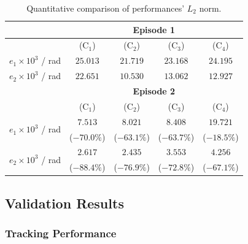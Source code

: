 \documentclass[lettersize,journal]{IEEEtran}
\begin{document}
\begin{table}[!t]
    \renewcommand{\arraystretch}{1.3}
    \caption{Quantitative comparison of performances' $L_2$ norm.}
    \centering
    \begin{tabular}{c c c c c}
    \hline
		& \multicolumn{4}{c}{\textbf{Episode 1}} \\
    \hline
	\hline 
		& (C$_1$) & (C$_2$) & (C$_3$) & (C$_4$) \\
	\hline
		$e_1\times10^{3}$ / rad & $25.013$ & $21.719$ & $23.168$ & $24.195$ \\
	\hline
        $e_2\times10^{3}$ / rad & $22.651$ & $10.530$ & $13.062$ & $12.927$ \\
	\hline
        & \multicolumn{4}{c}{\textbf{Episode 2}} \\
    \hline
    \hline
        & (C$_1$) & (C$_2$) & (C$_3$) & (C$_4$) \\
	\hline
    \multirow{2}{*}{$e_1\times10^{3}$ / rad} 
        & $7.513$ & $8.021$ & $8.408$ & $19.721$ \\
        & ($-70.0\%$) & ($-63.1\%$) & ($-63.7\%$) & ($-18.5\%$) \\
    \hline
    \multirow{2}{*}{$e_2\times10^{3}$ / rad} 
        & $2.617$ & $2.435$ & $3.553$ & $4.256$ \\
        & ($-88.4\%$) & ($-76.9\%$) & ($-72.8\%$) & ($-67.1\%$) \\
    \hline
    \end{tabular}
    \label{tab:sim:L2}
\end{table}

\subsection{Validation Results}

\subsubsection{Tracking Performance}
\end{document}
